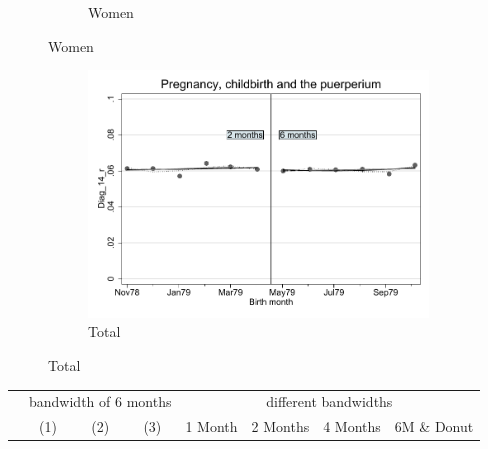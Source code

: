 \documentclass[a4paper ]{article}
\begin{document}
\begin{figure}[h!]
\begin{subfigure}[t]{0.31\textwidth}
		\caption{Women}
	\end{subfigure}
\end{figure}
\newpage
\begin{figure}[h]
	\centering
	\begin{subfigure}[t]{0.5\textwidth}
		\centering
		\includegraphics[width=0.99\textwidth]{R1_RD_Diag_14_r_fits}
		\caption{Total}		
	\end{subfigure}
	
\end{figure}


\begin{table}[h]\centering
\def\sym#1{\ifmmode^{#1}\else\(^{#1}\)\fi}
\begin{tabular}{l*{3}{c}|cccc}
\toprule
&\multicolumn{3}{c}{bandwidth of 6 months} & \multicolumn{4}{c}{different bandwidths} \\
 \cmidrule(lr{1em}){2-4} \cmidrule(lr{1em}){5-8}
 &\multicolumn{1}{c}{(1)}&\multicolumn{1}{c}{(2)}&\multicolumn{1}{c}{(3)}& 1 Month & 2 Months & 4 Months & 6M \& Donut \\
\midrule 

\bottomrule
\end{tabular}
\end{table}
\end{document}
